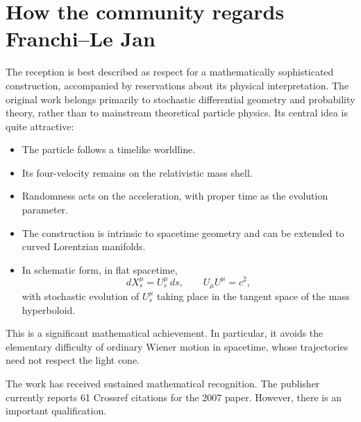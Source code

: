\section{ How the community regards Franchi–Le Jan}
The reception is best described as respect for a mathematically sophisticated construction, accompanied by reservations about its physical interpretation.
The original work belongs primarily to stochastic differential geometry and probability theory, rather than to mainstream theoretical particle physics.
Its central idea is quite attractive:
\begin{itemize}
   \item The particle follows a timelike worldline.
   \item Its four-velocity remains on the relativistic mass shell.
   \item Randomness acts on the acceleration, with proper time as the evolution parameter.
   \item The construction is intrinsic to spacetime geometry and can be extended to curved Lorentzian manifolds.
    \item In schematic form, in flat spacetime,
\[dX^\mu_s=U^\mu_s\,ds,\qquad U_\mu U^\mu=c^2,\]
with stochastic evolution of \(U^\mu_s\) taking place in the tangent space of the mass hyperboloid.
\end{itemize}
This is a significant mathematical achievement. In particular, it avoids the elementary difficulty of ordinary Wiener motion in spacetime, whose trajectories need not respect the light cone.

The work has received sustained mathematical recognition. The publisher currently reports 61 Crossref citations for the 2007 paper. 
However, there is an important qualification.

